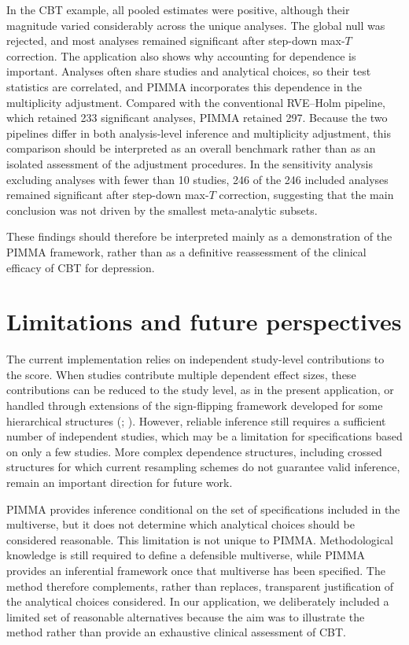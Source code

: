 \documentclass[
  man,
  longtable,
  nolmodern,
  notxfonts,
  notimes,
  colorlinks=true,linkcolor=blue,citecolor=blue,urlcolor=blue]{apa7}
\begin{document}
In the CBT example, all pooled estimates were positive, although their
magnitude varied considerably across the unique analyses. The global
null was rejected, and most analyses remained significant after
step-down max-\(T\) correction. The application also shows why
accounting for dependence is important. Analyses often share studies and
analytical choices, so their test statistics are correlated, and PIMMA
incorporates this dependence in the multiplicity adjustment. Compared
with the conventional RVE--Holm pipeline, which retained 233 significant
analyses, PIMMA retained 297. Because the two pipelines differ in both
analysis-level inference and multiplicity adjustment, this comparison
should be interpreted as an overall benchmark rather than as an isolated
assessment of the adjustment procedures. In the sensitivity analysis
excluding analyses with fewer than 10 studies, 246 of the 246 included
analyses remained significant after step-down max-\(T\) correction,
suggesting that the main conclusion was not driven by the smallest
meta-analytic subsets.

These findings should therefore be interpreted mainly as a demonstration
of the PIMMA framework, rather than as a definitive reassessment of the
clinical efficacy of CBT for depression.

\section{Limitations and future
perspectives}\label{limitations-and-future-perspectives}

The current implementation relies on independent study-level
contributions to the score. When studies contribute multiple dependent
effect sizes, these contributions can be reduced to the study level, as
in the present application, or handled through extensions of the
sign-flipping framework developed for some hierarchical structures
(;
). However,
reliable inference still requires a sufficient number of independent
studies, which may be a limitation for specifications based on only a
few studies. More complex dependence structures, including crossed
structures for which current resampling schemes do not guarantee valid
inference, remain an important direction for future work.

PIMMA provides inference conditional on the set of specifications
included in the multiverse, but it does not determine which analytical
choices should be considered reasonable. This limitation is not unique
to PIMMA. Methodological knowledge is still required to define a
defensible multiverse, while PIMMA provides an inferential framework
once that multiverse has been specified. The method therefore
complements, rather than replaces, transparent justification of the
analytical choices considered. In our application, we deliberately
included a limited set of reasonable alternatives because the aim was to
illustrate the method rather than provide an exhaustive clinical
assessment of CBT.
\end{document}
